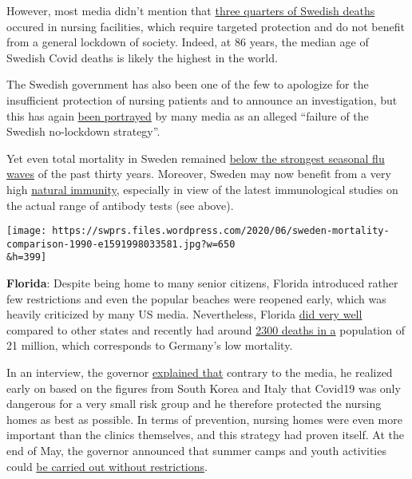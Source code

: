 However, most media didn't mention that
\href{https://www.thelocal.se/20200525/swedish-death-toll-passes-4000-as-coronavirus-cases-in-care-homes-start-to-fall}{three
quarters of Swedish deaths} occured in nursing facilities, which require
targeted protection and do not benefit from a general lockdown of
society. Indeed, at 86 years, the median age of Swedish Covid deaths is
likely the highest in the world.

The Swedish government has also been one of the few to apologize for the
insufficient protection of nursing patients and to announce an
investigation, but this has again
\href{https://www.spiked-online.com/2020/06/08/no-sweden-has-not-changed-its-mind-about-lockdown/}{been
portrayed} by many media as an alleged ``failure of the Swedish
no-lockdown strategy''.

Yet even total mortality in Sweden remained
\href{https://www.reuters.com/article/us-health-coronavirus-sweden-toll/coronavirus-pushes-swedish-deaths-to-highest-since-1993-in-april-idUSKBN22U1S4}{below
the strongest seasonal flu waves} of the past thirty years. Moreover,
Sweden may now benefit from a very high
\href{https://medicalxpress.com/news/2020-05-stockholm-virus-antibodies-sweden.html}{natural
immunity}, especially in view of the latest immunological studies on the
actual range of antibody tests (see above).

\texttt{[image: https://swprs.files.wordpress.com/2020/06/sweden-mortality-comparison-1990-e1591998033581.jpg?w=650\\\&h=399]}

\textbf{Florida}: Despite being home to many senior citizens, Florida
introduced rather few restrictions and even the popular beaches were
reopened early, which was heavily criticized by many US media.
Nevertheless, Florida
\href{https://www.statista.com/statistics/1109011/coronavirus-covid19-death-rates-us-by-state/}{did
very well} compared to other states and recently had around
\href{https://www.clickorlando.com/news/local/2020/03/16/interactive-map-shows-florida-coronavirus-cases-in-real-time/}{2300
deaths in a} population of 21 million, which corresponds to Germany's
low mortality.

In an interview, the governor
\href{https://www.nationalreview.com/2020/05/coronavirus-crisis-ron-desantis-florida-covid-19-strategy/}{explained
that} contrary to the media, he realized early on based on the figures
from South Korea and Italy that Covid19 was only dangerous for a very
small risk group and he therefore protected the nursing homes as best as
possible. In terms of prevention, nursing homes were even more important
than the clinics themselves, and this strategy had proven itself. At the
end of May, the governor announced that summer camps and youth
activities could
\href{https://www.usnews.com/news/best-states/florida/articles/2020-05-22/miami-beach-officials-agree-to-reopen-hotels-beaches-june-1}{be
carried out without restrictions}.

